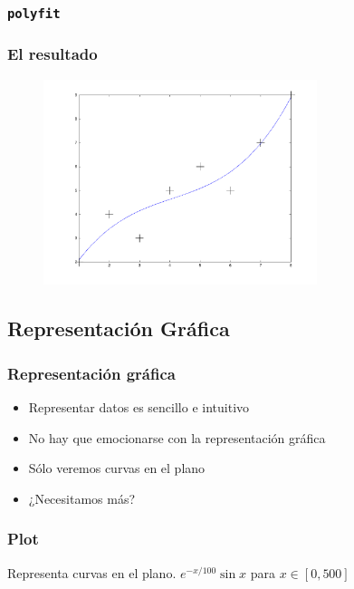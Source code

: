 \documentclass[12pt]{beamer}
\begin{document}

\begin{frame}
\frametitle{\texttt{polyfit}}
\testcode
\end{frame}

\begin{frame}
\frametitle{El resultado}
  \begin{figure}[h]
    \centering{}
    \includegraphics[width=8cm, keepaspectratio]{fig/polyfit.pdf}
  \end{figure}
\end{frame}

\subsection{Representación Gráfica}


\begin{frame}
\frametitle{Representación gráfica}
\begin{itemize}
\item Representar datos es sencillo e intuitivo
\item No hay que emocionarse con la representación gráfica
\item Sólo veremos curvas en el plano
\item ¿Necesitamos más?
\end{itemize}
\end{frame}


\begin{frame}
\frametitle{Plot}
Representa curvas en el plano. $e^{-x/100}\sin x$ para $x\in[0,500]$
\testcode
\end{frame}
\end{document}
